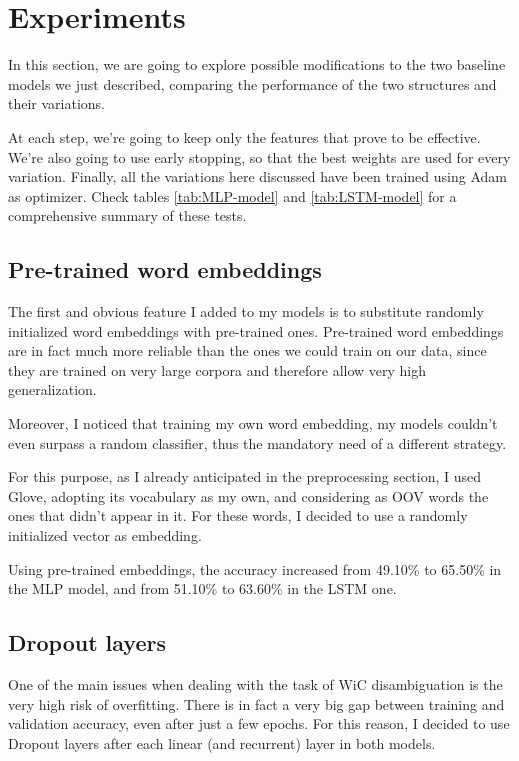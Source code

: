 \documentclass[11pt,a4paper]{article}
\begin{document}
	\section{Experiments}
	In this section, we are going to explore possible modifications to the two baseline models we just described, comparing the performance of the two structures and their variations.
	
	At each step, we're going to keep only the features that prove to be effective. We're also going to use early stopping, so that the best weights are used for every variation. Finally, all the variations here discussed have been trained using Adam \citep{kingma2017adam} as optimizer. Check tables \ref{tab:MLP-model} and \ref{tab:LSTM-model} for a comprehensive summary of these tests.
	
	\subsection{Pre-trained word embeddings}
	The first and obvious feature I added to my models is to substitute randomly initialized word embeddings with pre-trained ones. Pre-trained word embeddings are in fact much more reliable than the ones we could train on our data, since they are trained on very large corpora and therefore allow very high generalization.
	
	Moreover, I noticed that training my own word embedding, my models couldn't even surpass a random classifier, thus the mandatory need of a different strategy.
	
	For this purpose, as I already anticipated in the preprocessing section, I used Glove, adopting its vocabulary as my own, and considering as OOV words the ones that didn't appear in it. For these words, I decided to use a randomly initialized vector as embedding.
	
	Using pre-trained embeddings, the accuracy increased from 49.10\% to 65.50\% in the MLP model, and from 51.10\% to 63.60\% in the LSTM one.
	
	\subsection{Dropout layers}
	One of the main issues when dealing with the task of WiC disambiguation is the very high risk of overfitting. There is in fact a very big gap between training and validation accuracy, even after just a few epochs. For this reason, I decided to use Dropout layers \citep{JMLR:v15:srivastava14a} after each linear (and recurrent) layer in both models.
	
\end{document}
